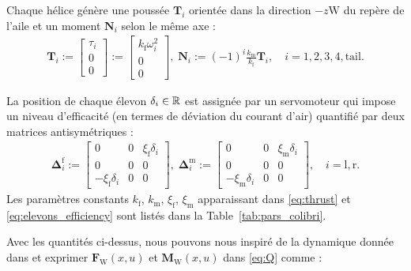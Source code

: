 Chaque hélice génère une poussée $\boldsymbol{T}_i$ orientée dans la direction $-z{\text{W}}$ du repère de l'aile et un moment $\boldsymbol{N}_i$ selon le même axe :
\begin{align}
\label{eq:thrustcolibri}
\boldsymbol{T}_{i} \!:=\! \begin{bmatrix} \tau_{i} \\ 0 \\ 0 \end{bmatrix} \!:=\!
\begin{bmatrix} k_{\text{f}}\omega_{i}^{2} \\ 0 \\ 0 \end{bmatrix}\! , \;
\boldsymbol{N}_{i} \!:=\! (-1)^{i}  \frac{k_{\text{m}} }{k_{\text{f}}}\boldsymbol{T}_{i}, \quad i=1,2,3,4,\text{tail} .
\end{align}  

La position de chaque élevon $\delta_i \in {\mathbb R}$ est assignée par un servomoteur qui impose un niveau d'efficacité (en termes de déviation du courant d'air) quantifié par deux matrices antisymétriques :
\begin{align}
\label{eq:elevons_efficiency_colibri}
    \boldsymbol{\Delta}^{\text{f}}_{i} \!:=\! \begin{bmatrix} 0 & 0 & \xi_{\text{f}}\delta_{i} \\ 0 & 0 & 0 \\ -\xi_{\text{f}}\delta_{i} & 0 & 0 \end{bmatrix}\! ,\;
    \boldsymbol{\Delta}^{\text{m}}_{i} \!:=\! \begin{bmatrix} 0 & 0 & \xi_{\text{m}}\delta_{i} \\ 0 & 0 & 0 \\ -\xi_{\text{m}}\delta_{i} & 0 & 0 \end{bmatrix} \!, \quad i=\text{l},\text{r}.
\end{align}
 Les paramètres constants $k_{\text{f}}$, $k_{\text{m}}$, $\xi_{\text{f}}$, $\xi_{\text{m}}$ apparaissant dans \eqref{eq:thrust} et \eqref{eq:elevons_efficiency} sont listés dans la Table~\ref{tab:pars_colibri}.


Avec les quantités ci-dessus, nous pouvons nous inspiré de la dynamique donnée dans  \cite[eqns (97),~(98)]{lustosaHal-03035938} et exprimer $\boldsymbol{F}_{\text{W}}(x,u)$ et $\boldsymbol{M}_{\text{W}}(x,u)$ dans \eqref{eq:Q} comme :

